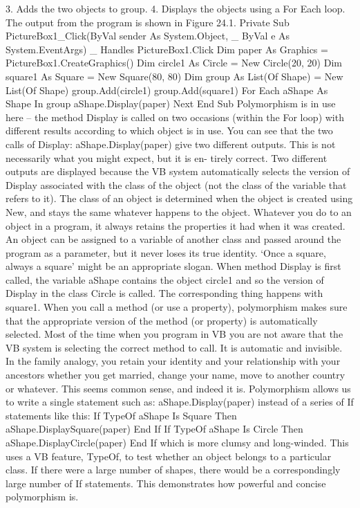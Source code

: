 3.	Adds the two objects to group.
4.	Displays the objects using a For Each loop.
The output from the program is shown in Figure 24.1.
Private Sub PictureBox1_Click(ByVal sender As System.Object, _
			ByVal e As System.EventArgs) _
			Handles PictureBox1.Click
	Dim paper As Graphics = PictureBox1.CreateGraphics()
	Dim circle1 As Circle = New Circle(20, 20)
	Dim square1 As Square = New Square(80, 80)
	Dim group As List(Of Shape) = New List(Of Shape)
	group.Add(circle1)
	group.Add(square1)
	For Each aShape As Shape In group
		aShape.Display(paper)
	Next
End Sub
Polymorphism is in use here – the method Display is called on two occasions (within the For loop) with different results according to which object is in use. You can see that the two calls of Display:
aShape.Display(paper)
give two different outputs. This is not necessarily what you might expect, but it is en-
tirely correct. Two different outputs are displayed because the VB system automatically selects the version of Display associated with the class of the object (not the class of 
the variable that refers to it). The class of an object is determined when the object is
created using New, and stays the same whatever happens to the object. Whatever you 
do to an object in a program, it always retains the properties it had when it was created. An object can be assigned to a variable of another class and passed around the program as a parameter, but it never loses its true identity. ‘Once a square, always a square’ might be an appropriate slogan.
When method Display is ﬁrst called, the variable aShape contains the object circle1 and so the version of Display in the class Circle is called. The corresponding thing happens with square1.
When you call a method (or use a property), polymorphism makes sure that the appropriate version of the method (or property) is automatically selected. Most of the time when you program in VB you are not aware that the VB system is selecting 
the correct method to call. It is automatic and invisible.
In the family analogy, you retain your identity and your relationship with your 
ancestors whether you get married, change your name, move to another country or whatever. This seems common sense, and indeed it is.
Polymorphism allows us to write a single statement such as:
aShape.Display(paper)
instead of a series of If statements like this:
If TypeOf aShape Is Square Then
	aShape.DisplaySquare(paper)
End If
If TypeOf aShape Is Circle Then
	aShape.DisplayCircle(paper)
End If
which is more clumsy and long-winded. This uses a VB feature, TypeOf, to test whether an object belongs to a particular class. If there were a large number of shapes, there would be a correspondingly large number of If statements. This demonstrates how powerful and concise polymorphism is.
